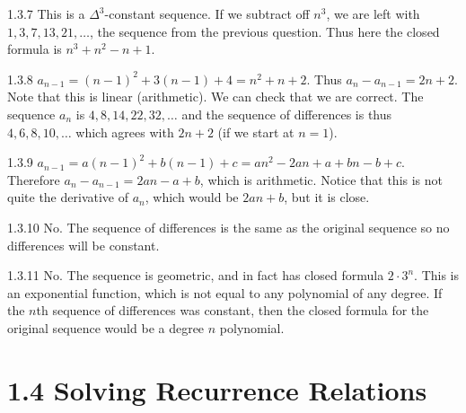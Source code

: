 \documentclass[11pt,]{book}
\theoremstyle{ptxplainnotitle}
\theoremstyle{ptxplaintitle}
\theoremstyle{ptxdefinitionnotitle}
\theoremstyle{ptxdefinitiontitle}
\theoremstyle{ptxdefinitionnotitle}
\theoremstyle{ptxdefinitiontitle}
\theoremstyle{ptxdefinitionnotitle}
\theoremstyle{ptxdefinitiontitle}
\theoremstyle{ptxdefinitiontitlenonumber}
\theoremstyle{ptxdefinitiontitlenonumber}
\numberwithin{equation}{chapter}
\begin{document}
\begin{divisionexercise}{1.3.7}
\textbf{}\hypertarget{p-394}{}%
This is a \(\Delta^3\)-constant sequence. If we subtract off \(n^3\), we are left with \(1, 3, 7, 13, 21, \ldots\), the sequence from the previous question. Thus here the closed formula is \(n^3 + n^2 - n + 1\).%
\end{divisionexercise}%
\begin{divisionexercise}{1.3.8}
\textbf{}\hypertarget{p-398}{}%
\(a_{n-1} = (n-1)^2 + 3(n-1) + 4 = n^2 + n + 2\text{.}\) Thus \(a_n - a_{n-1} = 2n+2\text{.}\) Note that this is linear (arithmetic). We can check that we are correct. The sequence \(a_n\) is \(4, 8, 14, 22, 32, \ldots\) and the sequence of differences is thus \(4, 6, 8, 10,\ldots\) which agrees with \(2n+2\) (if we start at \(n = 1\)).%
\end{divisionexercise}%
\begin{divisionexercise}{1.3.9}
\textbf{}\hypertarget{p-400}{}%
\(a_{n-1} = a(n-1)^2 + b(n-1) + c = an^2 - 2an + a + bn - b + c\). Therefore \(a_n - a_{n-1} = 2an - a + b\), which is arithmetic. Notice that this is not quite the derivative of \(a_n\), which would be \(2an + b\), but it is close.%
\end{divisionexercise}%
\begin{divisionexercise}{1.3.10}
\textbf{}\hypertarget{p-402}{}%
No. The sequence of differences is the same as the original sequence so no differences will be constant.%
\end{divisionexercise}%
\begin{divisionexercise}{1.3.11}
\textbf{}\hypertarget{p-404}{}%
No. The sequence is geometric, and in fact has closed formula \(2\cdot 3^n\). This is an exponential function, which is not equal to any polynomial of any degree. If the \(n\)th sequence of differences was constant, then the closed formula for the original sequence would be a degree \(n\) polynomial.%
\end{divisionexercise}%
\section*{1.4 Solving Recurrence Relations}
\end{document}
